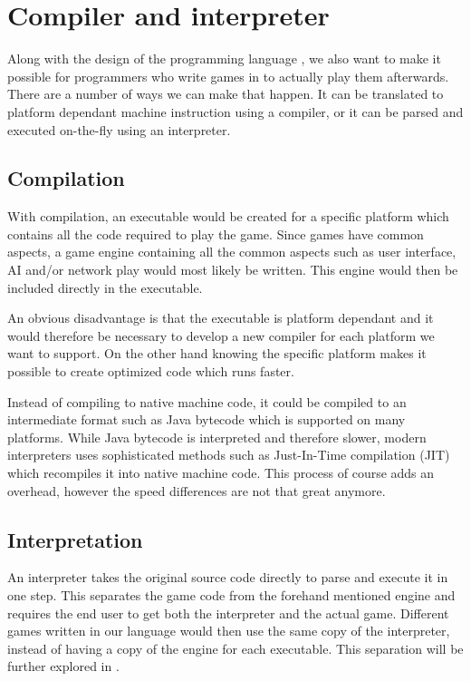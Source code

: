 \section{Compiler and interpreter}
Along with the design of the programming language \productname{}, we also want to make it possible for programmers who write games in \productname{} to actually play them afterwards. 
There are a number of ways we can make that happen. It can be translated to platform dependant machine instruction using a compiler, or it can be parsed and executed on-the-fly using an interpreter.

\subsection{Compilation}
With compilation, an executable would be created for a specific platform which contains all the code required to play the game. 
Since games have common aspects, a game engine containing all the common aspects such as user interface, AI and/or network play would most likely be written. 
This engine would then be included directly in the executable.

An obvious disadvantage is that the executable is platform dependant and it would therefore be necessary to develop a new compiler for each platform we want to support. 
On the other hand knowing the specific platform makes it possible to create optimized code which runs faster.

Instead of compiling to native machine code, it could be compiled to an intermediate format such as Java bytecode which is supported on many platforms.
While Java bytecode is interpreted and therefore slower, modern interpreters uses sophisticated methods such as Just-In-Time compilation (JIT) which recompiles it into native machine code. 
This process of course adds an overhead, however the speed differences are not that great anymore\cite{java-speed}.

\subsection{Interpretation}
An interpreter takes the original source code directly to parse and execute it in one step.
This separates the game code from the forehand mentioned engine and requires the end user to get both the interpreter and the actual game.
Different games written in our language would then use the same copy of the interpreter, instead of having a copy of the engine for each executable. This separation will be further explored in .

